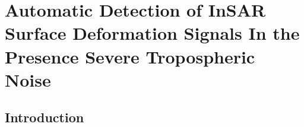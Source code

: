 
\chapter{Automatic Detection of InSAR Surface Deformation Signals In the Presence Severe Tropospheric Noise}



\section{Introduction}
\label{sec:ch6-intro}

